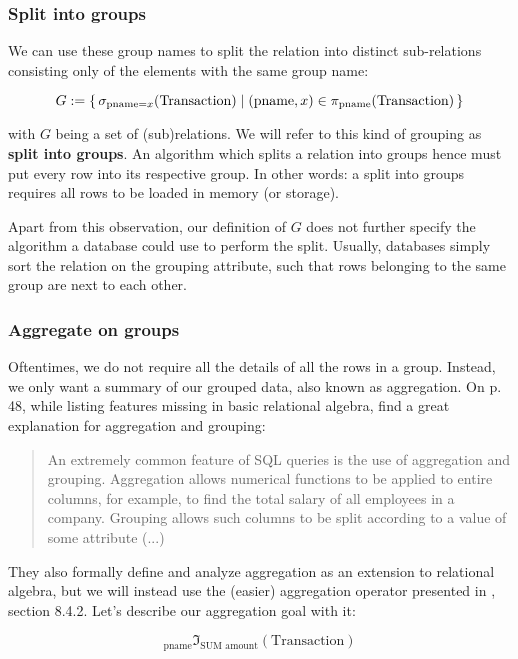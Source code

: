 \subsubsection{Split into groups} \label{Split into groups}

We can use these group names to split the relation into distinct sub-relations consisting
only of the elements with the same group name:

\[
    G := \set{\sigma_{\text{pname}=x}(\text{Transaction})
        | (\text{pname}, x) \in \pi_{\text{pname}}(\text{Transaction})}
\]

with $G$ being a set of (sub)relations. We will refer to this kind of grouping as
\textbf{split into groups}. An algorithm which splits a relation into groups hence
must put every row into its respective group. In other words: a
split into groups requires all rows to be loaded in memory (or storage).

Apart from this observation, our definition of $G$ does not further specify the algorithm
a database could use to perform the split. Usually,
databases simply sort the relation on the grouping attribute, such that
rows belonging to the same group are next to each other.

\subsubsection{Aggregate on groups} \label{Aggregate on groups}

Oftentimes, we do not require all the details of all the rows in a group.
Instead, we only want a summary of our grouped data, also known as aggregation.
On p. 48, while listing features missing in basic relational algebra, \cite{Aren22}
find a great explanation for aggregation and grouping:

\begin{quote}
An extremely common feature of SQL queries
is the use of aggregation and grouping. Aggregation allows numerical functions to be
applied to entire columns, for example, to find the total salary
of all employees in a company. Grouping allows such columns to be split
according to a value of some attribute (...)
\end{quote}
They also formally define and analyze aggregation as an extension to relational algebra,
but we will instead use the (easier) aggregation operator presented in \cite{Elma89},
section 8.4.2. Let's describe our aggregation goal with it:

\[
    _{\text{pname}}\mathfrak{I}_{\text{SUM amount}}(\text{Transaction})
\]

